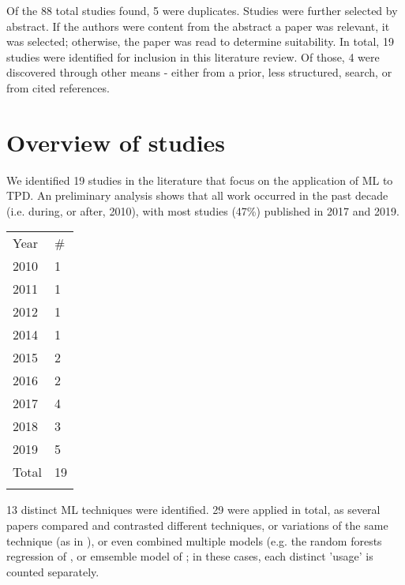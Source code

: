\documentclass{article}
\begin{document}
Of the 88 total studies found, 5 were duplicates. Studies were further selected by abstract. If the authors were content from the abstract a paper was relevant, it was selected; otherwise, the paper was read to determine suitability. In total, 19 studies were identified for inclusion in this literature review. Of those, 4 were discovered through other means - either from a prior, less structured, search, or from cited references.

\clearpage
\section{Overview of studies}

We identified 19 studies in the literature that focus on the application of ML to TPD. An preliminary analysis shows that all work occurred in the past decade (i.e. during, or after, 2010), with most studies (47\%) published in 2017 and 2019.

\begin{table}[h]
\centering
\begin{tabular}{ll}
\noalign{\smallskip}\hline \noalign{\smallskip}
Year  & \# \\	\noalign{\smallskip}\hline \noalign{\smallskip}
2010  & 1  \\
2011  & 1  \\
2012  & 1  \\
2014 & 1	\\
2015  & 2  \\
2016  & 2  \\
2017  & 4  \\
2018  & 3  \\
2019 & 5  \\ 	\noalign{\smallskip}
Total & 19 \\  \noalign{\smallskip}\hline
\end{tabular}
\end{table}

13 distinct ML techniques were identified. 29 were applied in total, as several papers compared and contrasted different techniques, or variations of the same technique (as in \cite{lessan_fu_wen_2019}\cite{oneto_fumeo_clerico_canepa_papa_dambra_mazzino_anguita_2016}\cite{milinkovic_markovic_veskovic_ivic_pavlovic_2013}\cite{markovic_milinkovic_tikhonov_schonfeld_2015}), or even combined multiple models (e.g. the random forests regression of \cite{wen_et_al_2017}, or emsemble model of \cite{nair_et_al_2019}; in these cases, each distinct 'usage' is counted separately. 
\end{document}
